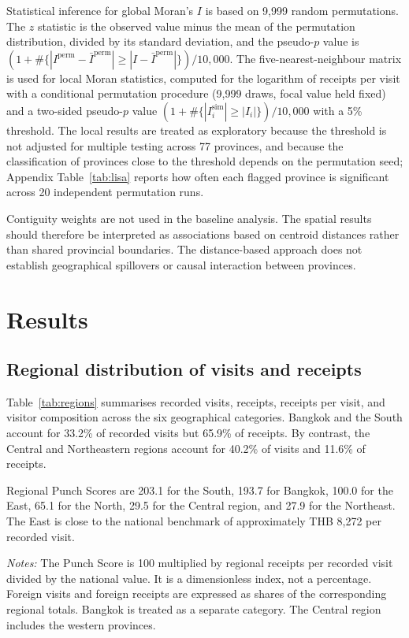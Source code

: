 \documentclass[11pt,a4paper]{article}
\theoremstyle{plain}\newtheorem{proposition}{Proposition}
\theoremstyle{definition}\newtheorem{definition}{Definition}
\begin{document}
Statistical inference for global Moran's $I$ is based on 9,999 random permutations. The $z$ statistic is the observed value minus the mean of the permutation distribution, divided by its standard deviation, and the pseudo-$p$ value is $(1+\#\{|I^{\mathrm{perm}}-\bar I^{\mathrm{perm}}|\ge|I-\bar I^{\mathrm{perm}}|\})/10{,}000$. The five-nearest-neighbour matrix is used for local Moran statistics, computed for the logarithm of receipts per visit with a conditional permutation procedure (9,999 draws, focal value held fixed) and a two-sided pseudo-$p$ value $(1+\#\{|I_i^{\mathrm{sim}}|\ge|I_i|\})/10{,}000$ with a 5\% threshold. The local results are treated as exploratory because the threshold is not adjusted for multiple testing across 77 provinces, and because the classification of provinces close to the threshold depends on the permutation seed; Appendix Table~\ref{tab:lisa} reports how often each flagged province is significant across 20 independent permutation runs.

Contiguity weights are not used in the baseline analysis. The spatial results should therefore be interpreted as associations based on centroid distances rather than shared provincial boundaries. The distance-based approach does not establish geographical spillovers or causal interaction between provinces.

\section{Results}
\subsection{Regional distribution of visits and receipts}
Table~\ref{tab:regions} summarises recorded visits, receipts, receipts per visit, and visitor composition across the six geographical categories. Bangkok and the South account for 33.2\% of recorded visits but 65.9\% of receipts. By contrast, the Central and Northeastern regions account for 40.2\% of visits and 11.6\% of receipts.

Regional Punch Scores are 203.1 for the South, 193.7 for Bangkok, 100.0 for the East, 65.1 for the North, 29.5 for the Central region, and 27.9 for the Northeast. The East is close to the national benchmark of approximately THB 8,272 per recorded visit.

\begin{table}[t]\centering\scriptsize
\caption{Tourism receipts, recorded visits and Punch Score by region, 2024}\label{tab:regions}
\resizebox{\textwidth}{!}{}\par\smallskip
\parbox{\textwidth}{\scriptsize\emph{Notes:} The Punch Score is 100 multiplied by regional receipts per recorded visit divided by the national value. It is a dimensionless index, not a percentage. Foreign visits and foreign receipts are expressed as shares of the corresponding regional totals. Bangkok is treated as a separate category. The Central region includes the western provinces.}
\end{table}
\end{document}
